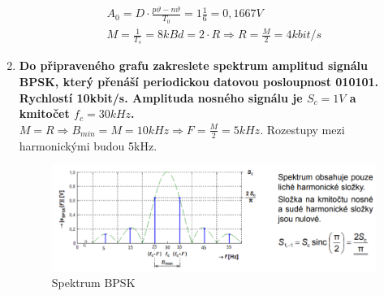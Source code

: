 \begin{enumerate}
\begin{align*}
        A_0 = D\cdot\frac{p\vartheta - n\vartheta}{T_0} = 1\frac{1}{6} = 0,1667V\\
        M = \frac{1}{T_s} = 8kBd = 2\cdot R \Rightarrow R = \frac{M}{2} = 4kbit/s
    \end{align*}
    \item \textbf{Do připraveného grafu zakreslete spektrum amplitud signálu BPSK, který přenáší
    periodickou datovou posloupnost 010101. Rychlostí 10kbit/s. Amplituda nosného signálu je
    \(S_c=1V\) a kmitočet \(f_c = 30kHz\).}\\
    \(M = R \Rightarrow B_{min} = M = 10kHz \Rightarrow F = \frac{M}{2} = 5kHz\). Rozestupy mezi harmonickými budou 5kHz.\\
    \begin{figure}[h]
        \centering
        \includegraphics[scale = 0.4]{images/BPSK.png}
        \caption{Spektrum BPSK}
    \end{figure}
\end{enumerate}

